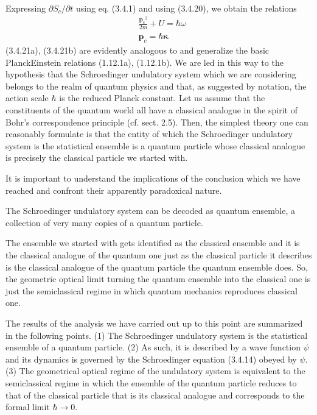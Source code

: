 \documentclass{article}
\begin{document}
Expressing $\partial S_{c} / \partial t$ using eq. (3.4.1) and using (3.4.20), we obtain the relations
$$
\begin{align*}
& \frac{\boldsymbol{p}_{c}{ }^{2}}{2 m}+U=\hbar \omega  \tag{3.4.21a}\\
& \boldsymbol{p}_{c}=\hbar \boldsymbol{\kappa} \tag{3.4.21b}
\end{align*}
$$
(3.4.21a), (3.4.21b) are evidently analogous to and generalize the basic PlanckEinstein relations (1.12.1a), (1.12.1b). We are led in this way to the hypothesis that
the Schroedinger undulatory system which we are considering belongs to the realm of quantum physics
and that, as suggested by notation,
the action scale $\hbar$ is the reduced Planck constant.
Let us assume that the constituents of the quantum world all have a classical analogue in the spirit of Bohr's correspondence principle (cf. sect. 2.5). Then, the simplest theory one can reasonably formulate is that
the entity of which the Schroedinger undulatory system is the statistical ensemble is a quantum particle whose classical analogue is precisely the classical particle we started with.

It is important to understand the implications of the conclusion which we have reached and confront their apparently paradoxical nature.

The Schroedinger undulatory system can be decoded as quantum ensemble, a collection of very many copies of a quantum particle.

The ensemble we started with gets identified as the classical ensemble and it is the classical analogue of the quantum one just as the classical particle it describes is the classical analogue of the quantum particle the quantum ensemble does. So, the geometric optical limit turning the quantum ensemble into the classical one is just the semiclassical regime in which quantum mechanics reproduces classical one.

The results of the analysis we have carried out up to this point are summarized in the following points.
(1) The Schroedinger undulatory system is the statistical ensemble of a quantum particle.
(2) As such, it is described by a wave function $\psi$ and its dynamics is governed by the Schroedinger equation (3.4.14) obeyed by $\psi$.
(3) The geometrical optical regime of the undulatory system is equivalent to the semiclassical regime in which the ensemble of the quantum particle reduces to that of the classical particle that is its classical analogue and corresponds to the formal limit $\hbar \rightarrow 0$.
\end{document}
